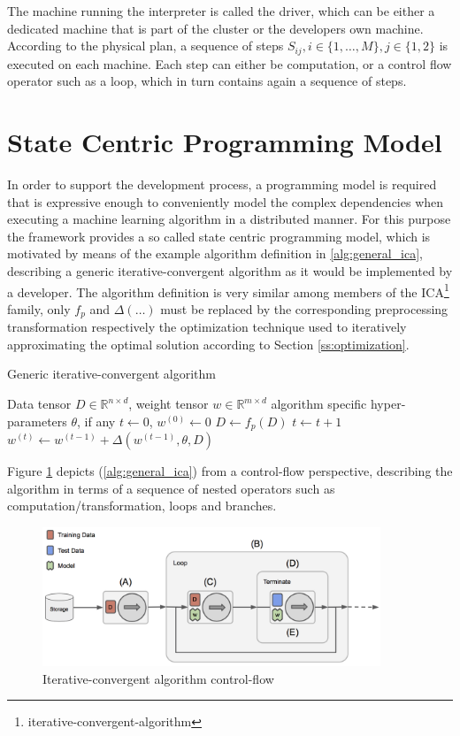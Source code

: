 The machine running the interpreter is called the driver, which can be either a dedicated machine that is part of the cluster or the developers own machine.
According to the physical plan, a sequence of steps $S_{ij}, i \in \{1, \ldots, M\}, j \in \{1, 2\}$ is executed on each machine.
Each step can either be computation, or a control flow operator such as a loop, which in turn contains again a sequence of steps.


\section{State Centric Programming Model}
In order to support the development process, a programming model is required that is expressive enough to conveniently model the complex dependencies when executing a machine learning algorithm in a distributed manner.
For this purpose the framework provides a so called state centric programming model, which is motivated by means of the example algorithm definition in \ref{alg:general_ica}, describing a generic iterative-convergent algorithm as it would be implemented by a developer.
The algorithm definition is very similar among members of the ICA\footnote{iterative-convergent-algorithm} family, only $f_p$ and $\Delta(\ldots)$ must be replaced by the corresponding preprocessing transformation respectively the optimization technique used to iteratively approximating the optimal solution according to Section \ref{ss:optimization}.
\begin{algorithm}
\caption{Generic iterative-convergent algorithm}\label{alg:general_ica}
\begin{algorithmic}[1]{}
\ALGSTATE Data tensor $D \in \mathbb{R}^{n \times d}$, weight tensor $w \in \mathbb{R}^{m \times d}$
\INPUT algorithm specific hyper-parameters $\theta$, if any
\INIT $t \gets 0$, $w^{(0)} \gets 0$
\State $D \gets f_{p}(D)$ 
\Repeat {}
\State $t \gets t + 1$
\State $w^{(t)} \gets w^{(t-1)} + \Delta(w^{(t-1)}, \theta, D)$ 
 
\end{algorithmic}
\end{algorithm}
Figure \ref{fig:ica_control_flow} depicts (\ref{alg:general_ica}) from a control-flow perspective, describing the algorithm in terms of a sequence of nested operators such as computation/transformation, loops and branches.
\begin{figure}[ht]
\centering
\includegraphics[width=0.9\textwidth]{img/ica_control_flow.png}
\caption{Iterative-convergent algorithm control-flow}
\label{fig:ica_control_flow}
\end{figure}

